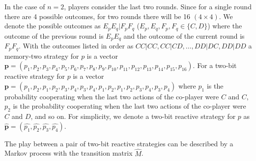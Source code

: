 \documentclass{article}
\theoremstyle{definition}
\begin{document}
In the case of \(n=2\), players consider the last two rounds. Since for a single
round there are 4 possible outcomes, for two rounds there will be 16 \((4 \times
4)\). We denote the possible outcomes as \(E_p E_q | F_p F_q\) (\(E_p, E_q, F_p,
F_q \in \{C, D\}\)) where the outcome of the previous round is \(E_p E_q\) and
the outcome of the current round is \(F_p F_q\). With the outcomes listed in
order as \(CC|CC, CC|CD, \dots, DD|DC, DD|DD\) a memory-two strategy for \(p\) is a
vector \(\mathbf{p} = (p_1, p_2, p_3, p_4, p_5, p_6, p_7, p_8, p_9, p_{10},
p_{11}, p_{12}, p_{13}, p_{14}, \allowbreak p_{15}, p_{16})\). For a two-bit
reactive strategy for \(p\) is a vector \(\mathbf{p} = (p_1, p_2, p_1, p_2, p_3,
p_4, p_3, p_4, p_1, p_2, p_1, p_2, p_3, p_4, \allowbreak p_3, p_4)\) where
\(p_1\) is the probability cooperating when the last two actions of the
co-player were \(C\) and \(C\), \(p_2\) is the probability cooperating when the
last two actions of the co-player were \(C\) and \(D\), and so on. For
simplicity, we denote a two-bit reactive strategy for \(p\) as
\(\mathbf{\hat{p}} = (\hat{p_1}, \hat{p_2}, \hat{p_3}, \hat{p_4})\).

The play between a pair of two-bit reactive strategies can be described by a Markov
process with the transition matrix \(\hat{M}\).
\end{document}
